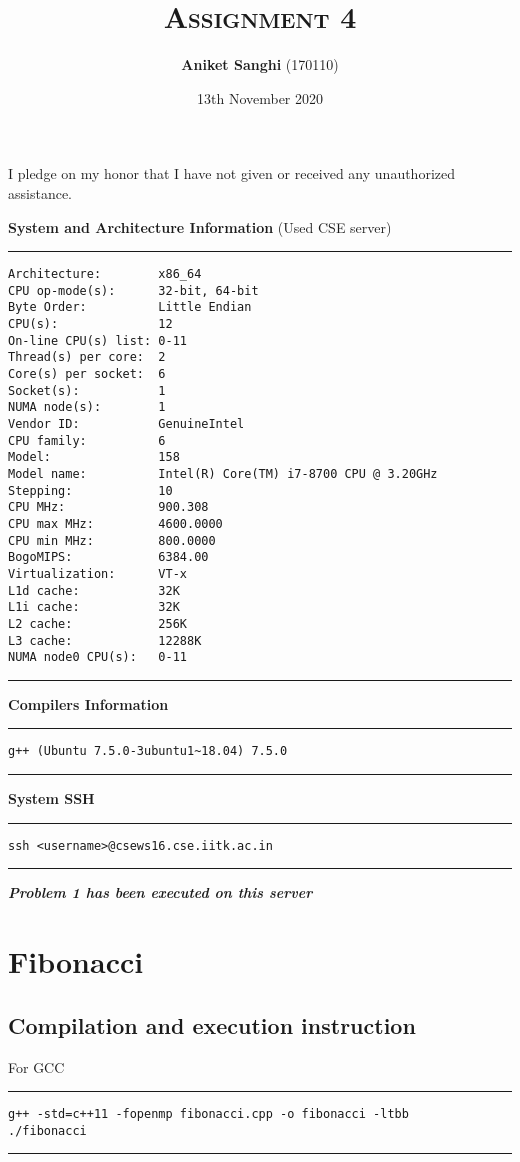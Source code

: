 \documentclass[a4paper]{article}
\title{\textsc{Assignment 4}}
\author{\textbf{Aniket Sanghi} (170110)}
\date{13th November 2020}
\begin{document}
\maketitle
\thispagestyle{fancy}
\fancyhead{}
\cfoot{\thepage}
\begin{center}
I pledge on my honor that I have not given or received any unauthorized assistance.\\
\end{center}
\vspace{1cm}
{\Large\bf System and Architecture Information } (Used CSE server)
\vspace{0.5cm}
\hrule
\begin{lstlisting}
Architecture:        x86_64
CPU op-mode(s):      32-bit, 64-bit
Byte Order:          Little Endian
CPU(s):              12
On-line CPU(s) list: 0-11
Thread(s) per core:  2
Core(s) per socket:  6
Socket(s):           1
NUMA node(s):        1
Vendor ID:           GenuineIntel
CPU family:          6
Model:               158
Model name:          Intel(R) Core(TM) i7-8700 CPU @ 3.20GHz
Stepping:            10
CPU MHz:             900.308
CPU max MHz:         4600.0000
CPU min MHz:         800.0000
BogoMIPS:            6384.00
Virtualization:      VT-x
L1d cache:           32K
L1i cache:           32K
L2 cache:            256K
L3 cache:            12288K
NUMA node0 CPU(s):   0-11
\end{lstlisting}
\hrule 
\vspace{0.5cm}
{\Large\bf Compilers Information } 
\vspace{0.5cm}
\hrule
\begin{lstlisting}
g++ (Ubuntu 7.5.0-3ubuntu1~18.04) 7.5.0
\end{lstlisting}
\hrule 
\vspace{0.5cm}
{\Large\bf System SSH } 
\vspace{0.5cm}
\hrule
\begin{lstlisting}
ssh <username>@csews16.cse.iitk.ac.in
\end{lstlisting}
\hrule 
\vspace{1cm}
{\bf \emph{Problem 1 has been executed on this server}}

\newpage

\section{\Huge Fibonacci}
\vspace{0.5cm}
\subsection{Compilation and execution instruction }
\vspace{0.3cm}
For GCC
\vspace{0.2cm}
\hrule
\begin{lstlisting}
g++ -std=c++11 -fopenmp fibonacci.cpp -o fibonacci -ltbb
./fibonacci
\end{lstlisting}
\hrule 
\vspace{0.5cm}
\end{document}

